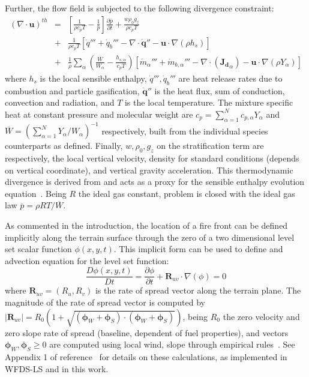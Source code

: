 \documentclass[journal,article,atmosphere,submit,moreauthors,pdftex]{Definitions/mdpi}
\begin{document}
Further, the flow field is subjected to the following divergence constraint:
%
\begin{eqnarray}
    ( \nabla \cdot \mathbf{u} )^{th} &=& 
    \left[ \frac{1}{\rho c_p T} - \frac{1}{\bar{p}} \right] 
    \frac{\partial \bar{p}}{\partial t} + \frac{w \rho_0 g_z}{\rho c_p T} \nonumber \\
    &+& \frac{1}{\rho c_p T} \left[ \dot{q}''' + \dot{q}_b''' - \nabla \cdot \dot{\mathbf{q}}'' - \mathbf{u} \cdot \nabla (\rho h_s) \right] \nonumber \\
    &+& \frac{1}{\rho} \sum_\alpha \left( \frac{\overline{W}}{W_\alpha} - \frac{h_{s,\alpha}}{c_p T} \right) \left[ \dot{m}_\alpha'''  + \dot{m}_{b,\alpha}''' - \nabla \cdot (\mathbf{J_{d}}_\alpha) - \mathbf{u} \cdot \nabla (\rho Y_\alpha) \right] \label{eq:divth}
\end{eqnarray}
%
where $h_s$ is the local sensible enthalpy, $\dot{q}''', \dot{q}_b'''$ are heat release rates due to combustion and particle gasification, $\dot{\mathbf{q}}''$ is the heat flux, sum of conduction, convection and radiation, and $T$ is the local temperature. The mixture specific heat at constant pressure and molecular weight are $c_p=\sum_{\alpha =1}^N{c_{p,\alpha} Y_\alpha}$ and $\overline{W}=\left(\sum_{\alpha =1}^N{Y_\alpha /W_\alpha} \right)^{-1}$ respectively, built from the individual species counterparts as defined. Finally, $w,\rho_0,g_z$ on the stratification term are respectively, the local vertical velocity, density for standard conditions (depends on vertical coordinate), and vertical gravity acceleration. This thermodynamic divergence is derived from and acts as a proxy for the sensible enthalpy evolution equation~\cite{mcdermo_2014}. Being $R$ the ideal gas constant, problem is closed with the ideal gas law $ \overline{p} = {\rho R T}/{\overline{W}}$.

As commented in the introduction, the location of a fire front can be defined implicitly along the terrain surface through the zero of a two dimensional level set scalar function $\phi(x,y,t)$. This implicit form can be used to define and advection equation for the level set function:
%
\begin{equation}
   \frac{D \phi(x,y,t)}{D t} =  \frac{\partial \phi}{\partial t} + \mathbf{R}_{uv} \cdot \nabla (\phi) = 0 \label{eqn:lset}
\end{equation}
%
where $\mathbf{R}_{uv}=(R_u,R_v)$ is the rate of spread vector along the terrain plane. The magnitude of the rate of spread vector is computed by $|\mathbf{R}_{uv}|=R_0 \left(1 + \sqrt{(\boldsymbol{\phi}_W+\boldsymbol{\phi}_S) \cdot (\boldsymbol{\phi}_W+\boldsymbol{\phi}_S) } \right)$, being $R_0$ the zero velocity and zero slope rate of spread (baseline, dependent of fuel properties), and vectors $\boldsymbol{\phi}_W,\boldsymbol{\phi}_S \ge 0$ are computed using local wind, slope through empirical rules~\cite{Wilson:1980}. See Appendix 1 of reference~\cite{Bova:IJWF2015} for details on these calculations, as implemented in WFDS-LS and in this work.  
\end{document}
